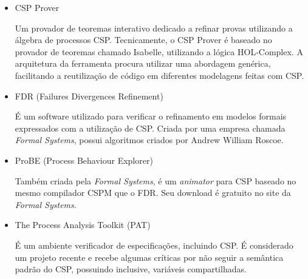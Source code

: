 \begin{itemize}
\item{CSP Prover}

Um provador de teoremas interativo dedicado a refinar provas utilizando a álgebra de processos CSP. Tecnicamente,
o CSP Prover é baseado no provador de teoremas chamado Isabelle, utilizando a lógica HOL-Complex. A arquitetura
da ferramenta procura utilizar uma abordagem genérica, facilitando a reutilização de código em diferentes modelagens
feitas com CSP.

\item{FDR (Failures Divergences Refinement)}

É um software utilizado para verificar o refinamento em modelos formais expressados com a utilização de CSP.
Criada por uma empresa chamada \textit{Formal Systems}, possui algoritmos criados por Andrew William Roscoe.

\item{ProBE (Process Behaviour Explorer)}

Também criada pela \textit{Formal Systems}, é um \textit{animator} para CSP baseado no mesmo compilador CSPM que o FDR.
Seu download é gratuito no site da \textit{Formal Systems}.

\item{The Process Analysis Toolkit (PAT)}

É um ambiente verificador de especificações, incluindo CSP. É considerado um projeto recente e recebe algumas críticas
por não seguir a semântica padrão do CSP, possuindo inclusive, variáveis compartilhadas.

\end{itemize}
